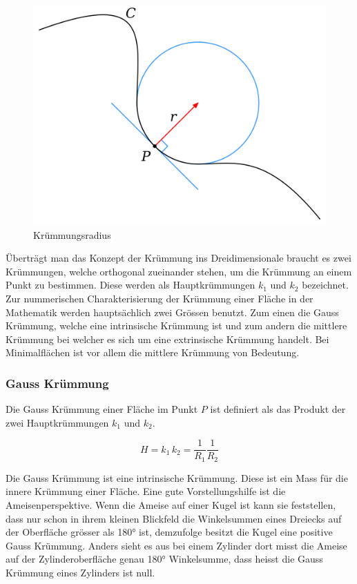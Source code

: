 \begin{refsection}
\begin{figure} 
  \centering
  \includegraphics[scale=0.1]{minimal/Kruemmungsradius.png}
  \caption{Krümmungsradius} 
\end{figure}

Überträgt man das Konzept der Krümmung ins Dreidimensionale braucht es zwei Krümmungen, welche orthogonal zueinander stehen, um die Krümmung an einem Punkt zu bestimmen. Diese werden als Hauptkrümmungen $k_1$ und $k_2$ bezeichnet.
Zur nummerischen Charakterisierung der Krümmung einer Fläche in der Mathematik werden hauptsächlich zwei Grössen benutzt.
Zum einen die Gauss Krümmung, welche eine intrinsische Krümmung ist und zum andern die mittlere Krümmung bei welcher es sich um eine extrinsische Krümmung handelt. Bei Minimalflächen ist vor allem die mittlere Krümmung von Bedeutung.


\subsubsection{Gauss Krümmung}
Die Gauss Krümmung einer Fläche im Punkt $P$ ist definiert als das Produkt der zwei Hauptkrümmungen $k_1$ und $k_2$.

\begin{equation} \label{Gauss_Kruemmung_D}
  H=k_1\, k_2= \frac{1}{R_1}\frac{1}{R_2}
\end{equation}



Die Gauss Krümmung ist eine intrinsische Krümmung. Diese ist  ein Mass für die innere Krümmung einer Fläche. 
Eine gute Vorstellungshilfe ist die Ameisenperspektive. 
Wenn die Ameise auf einer Kugel ist kann sie feststellen, dass nur schon in ihrem kleinen Blickfeld die Winkelsummen eines Dreiecks auf der Oberfläche grösser als 180° ist, demzufolge besitzt die Kugel eine positive Gauss Krümmung. Anders sieht es aus bei einem Zylinder dort misst die Ameise auf der Zylinderoberfläche genau 180° Winkelsumme, dass heisst die Gauss Krümmung eines Zylinders ist null.


\end{refsection}
